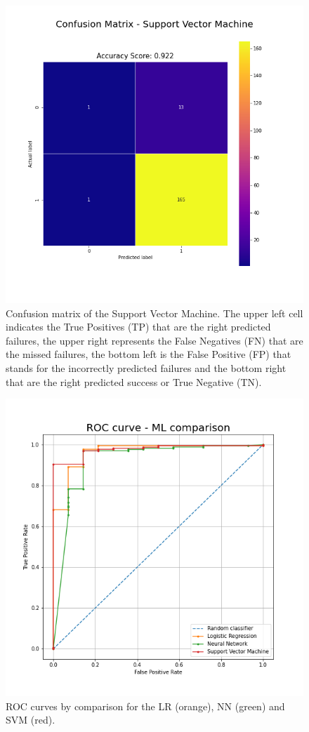 \documentclass[english,notitlepage,reprint,nofootinbib]{revtex4-1}  %
\begin{document}
\begin{figure}[h]
    \centering 
    \includegraphics[scale=0.3]{results/confusionmatrix_svm.png}
    \caption{Confusion matrix of the Support Vector Machine. The upper left cell indicates the True Positives (TP) that are the right predicted failures, the upper right represents the False Negatives (FN) that are the missed failures, the bottom left is the False Positive (FP) that stands for the incorrectly predicted failures and the bottom right that are the right predicted success or True Negative (TN).}
    \label{res:cf_svm}
\end{figure}
\begin{figure}[h]
    \centering 
    \includegraphics[scale=0.3]{results/ROC_comp.png}
    \caption{ROC curves by comparison for the LR (orange), NN (green) and SVM (red).}
    \label{res:roc}
\end{figure}
\end{document}
